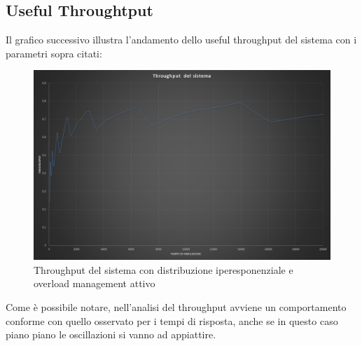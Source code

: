 \subsection{Useful Throughtput}
Il grafico successivo illustra l'andamento dello useful throughput del sistema con i 
parametri sopra citati:
\begin{figure}[H]
 \centering
 \includegraphics[scale=0.45]{img/throughputOM.png}
 \caption[Throughput del sistema con distribuzione iperesponenziale e overload management attivo]{Throughput del sistema con distribuzione iperesponenziale e overload management attivo}
 \label{fig:Throughput del sistema con distribuzione iperesponenziale e overload management attivo}
\end{figure}
Come \`e possibile notare, nell'analisi del throughput avviene un comportamento conforme con quello osservato per i tempi di risposta, anche se in questo caso piano
piano le oscillazioni si vanno ad appiattire.

